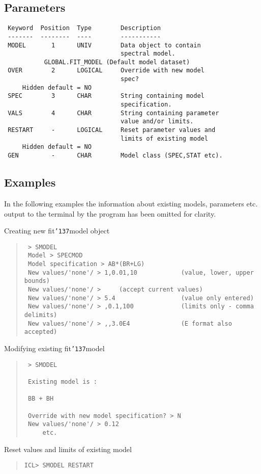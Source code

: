 \documentclass{book}
\renewcommand{\_}{{\tt\char'137}}     %
\begin{document}
\subsection{Parameters}
\begin{verbatim}
 Keyword  Position  Type        Description
 -------  --------  ----        -----------
 MODEL       1      UNIV        Data object to contain
                                spectral model.
           GLOBAL.FIT_MODEL (Default model dataset)
 OVER        2      LOGICAL     Override with new model
                                spec?
     Hidden default = NO
 SPEC        3      CHAR        String containing model
                                specification.
 VALS        4      CHAR        String containing parameter
                                value and/or limits.
 RESTART     -      LOGICAL     Reset parameter values and
                                limits of existing model
     Hidden default = NO
 GEN         -      CHAR        Model class (SPEC,STAT etc).

\end{verbatim}\subsection{Examples}
In the following examples the information about existing models,
parameters etc. output to the terminal by the program has been
omitted for clarity.

Creating new fit\_model object

\begin{quote}\begin{verbatim}
 > SMODEL
 Model > SPECMOD
 Model specification > AB*(BR+LG)
 New values/'none'/ > 1,0.01,10            (value, lower, upper bounds)
 New values/'none'/ >     (accept current values)
 New values/'none'/ > 5.4                  (value only entered)
 New values/'none'/ > ,0.1,100             (limits only - comma delimits)
 New values/'none'/ > ,,3.0E4              (E format also accepted)
\end{verbatim}\end{quote}
Modifying existing fit\_model
\begin{quote}\begin{verbatim}
 > SMODEL

 Existing model is :

 BB + BH

 Override with new model specification? > N
 New values/'none'/ > 0.12
     etc.
\end{verbatim}\end{quote}
Reset values and limits of existing model
\begin{quote}\begin{verbatim}
ICL> SMODEL RESTART
\end{verbatim}\end{quote}
\end{document}
